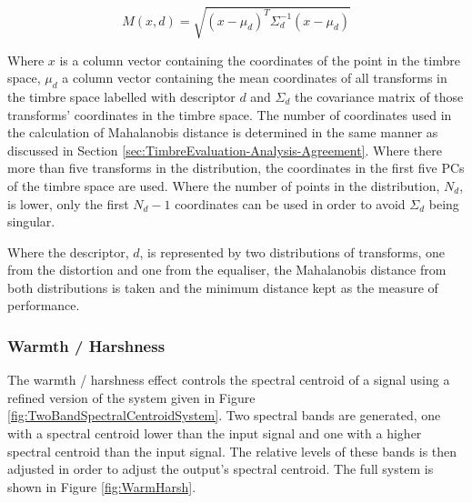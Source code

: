 		\begin{equation}
			M(x, d) = \sqrt{(x - \mu_{d})^{T}\Sigma_{d}^{-1}(x - \mu_{d})}
			\label{eq:Mahalanobis}
		\end{equation}

		Where $x$ is a column vector containing the coordinates of the point in the timbre space, $\mu_{d}$ a column
		vector containing the mean coordinates of all transforms in the timbre space labelled with descriptor $d$
		and $\Sigma_{d}$ the covariance matrix of those transforms' coordinates in the timbre space. The number of
		coordinates used in the calculation of Mahalanobis distance is determined in the same manner as discussed in
		Section \ref{sec:TimbreEvaluation-Analysis-Agreement}. Where there more than five transforms in the
		distribution, the coordinates in the first five PCs of the timbre space are used. Where the number of points
		in the distribution, $N_{d}$, is lower, only the first $N_{d} - 1$ coordinates can be used in order to avoid
		$\Sigma_{d}$ being singular.

		Where the descriptor, $d$, is represented by two distributions of transforms, one from the distortion and
		one from the equaliser, the Mahalanobis distance from both distributions is taken and the minimum distance
		kept as the measure of performance.

		\subsubsection*{Warmth / Harshness}
			The warmth / harshness effect controls the spectral centroid of a signal using a refined version of
			the system given in Figure \ref{fig:TwoBandSpectralCentroidSystem}. Two spectral bands are
			generated, one with a spectral centroid lower than the input signal and one with a higher spectral
			centroid than the input signal. The relative levels of these bands is then adjusted in order to
			adjust the output's spectral centroid. The full system is shown in Figure \ref{fig:WarmHarsh}.


